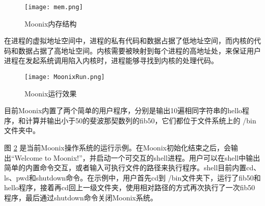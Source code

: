 \begin{figure}[htpb]
	\centering
	\texttt{[image: mem.png]}
	\setlength{\abovecaptionskip}{2pt}
	\caption{Moonix内存结构}
	\label{pic:moonixmem}
\end{figure}

在进程的虚拟地址空间中，进程的私有代码和数据占据了低地址空间，而内核的代码和数据占据了高地址空间。内核需要被映射到每个进程的高地址处，来保证用户进程在发起系统调用陷入内核时，进程能够寻找到内核的处理代码。

\begin{figure}[htpb]
	\centering
	\texttt{[image: MoonixRun.png]}
	\caption{Moonix运行效果}
	\label{pic:moonixrun}
\end{figure}

目前Moonix内置了两个简单的用户程序，分别是输出10遍相同字符串的hello程序，和计算并输出小于50的斐波那契数列的fib50，它们都位于文件系统上的 /bin文件夹中。

图 \ref{pic:moonixrun} 是当前Moonix操作系统的运行示例。在Moonix初始化结束之后，会输出“Welcome to Moonix!”，并启动一个可交互的shell进程。用户可以在shell中输出简单的内置命令交互，或者输入可执行文件的路径来执行程序。shell目前内置cd、ls、pwd和shutdown命令。在示例中，用户首先cd到 /bin文件夹下，运行了fib50和hello程序，接着再cd回上一级文件夹，使用相对路径的方式再次执行了一次fib50程序，最后通过shutdown命令关闭Moonix系统。